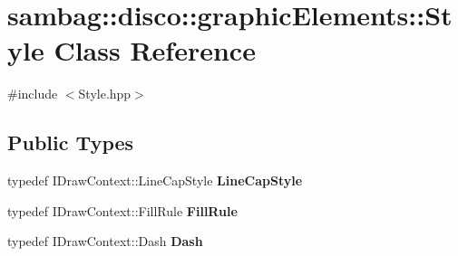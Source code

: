 \hypertarget{classsambag_1_1disco_1_1graphic_elements_1_1_style}{
\section{sambag::disco::graphicElements::Style Class Reference}
\label{classsambag_1_1disco_1_1graphic_elements_1_1_style}
}


{\ttfamily \#include $<$Style.hpp$>$}

\subsection*{Public Types}
\begin{DoxyCompactItemize}
\item 
\hypertarget{classsambag_1_1disco_1_1graphic_elements_1_1_style_adc16c653a4de1edd9a1b59b188647f10}{
typedef IDrawContext::LineCapStyle {\bfseries LineCapStyle}}
\label{classsambag_1_1disco_1_1graphic_elements_1_1_style_adc16c653a4de1edd9a1b59b188647f10}

\item 
\hypertarget{classsambag_1_1disco_1_1graphic_elements_1_1_style_a97d9cc81fd55912e4f7c97019500814d}{
typedef IDrawContext::FillRule {\bfseries FillRule}}
\label{classsambag_1_1disco_1_1graphic_elements_1_1_style_a97d9cc81fd55912e4f7c97019500814d}

\item 
\hypertarget{classsambag_1_1disco_1_1graphic_elements_1_1_style_a2eb4c7882b60e4f4f26690645c99b75e}{
typedef IDrawContext::Dash {\bfseries Dash}}
\label{classsambag_1_1disco_1_1graphic_elements_1_1_style_a2eb4c7882b60e4f4f26690645c99b75e}

\end{DoxyCompactItemize}
